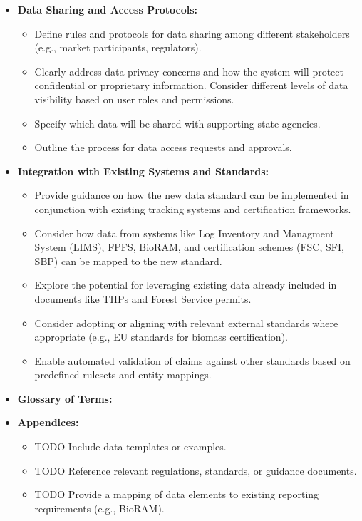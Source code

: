 \documentclass[a4paper, 11pt]{article}
\begin{document}
\begin{itemize}
    \item \textbf{Data Sharing and Access Protocols:}
        \begin{itemize}
            \item Define rules and protocols for data sharing among different stakeholders (e.g., market participants, regulators).
            \item Clearly address data privacy concerns and how the system will protect confidential or proprietary information. Consider different levels of data visibility based on user roles and permissions.
            \item Specify which data will be shared with supporting state agencies.
            \item Outline the process for data access requests and approvals.
        \end{itemize}

    \item \textbf{Integration with Existing Systems and Standards:}
        \begin{itemize}
            \item Provide guidance on how the new data standard can be implemented in conjunction with existing tracking systems and certification frameworks.
            \item Consider how data from systems like Log Inventory and Managment System (LIMS), FPFS, BioRAM, and certification schemes (FSC, SFI, SBP) can be mapped to the new standard.
            \item Explore the potential for leveraging existing data already included in documents like THPs and Forest Service permits.
            \item Consider adopting or aligning with relevant external standards where appropriate (e.g., EU standards for biomass certification).
            \item Enable automated validation of claims against other standards based on predefined rulesets and entity mappings.
        \end{itemize}

    \item \textbf{Glossary of Terms:}

    \item \textbf{Appendices:}
        \begin{itemize}
            \item TODO Include data templates or examples.
            \item TODO Reference relevant regulations, standards, or guidance documents.
            \item TODO Provide a mapping of data elements to existing reporting requirements (e.g., BioRAM).
        \end{itemize}

\end{itemize} %
\end{document}
